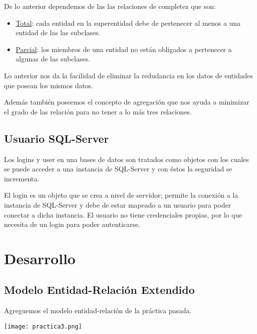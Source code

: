 \documentclass[12pt, letterpaper]{article}
\begin{document}
        De lo anterior dependemos de las las relaciones de completez que son:

        \begin{itemize}
            \item \underline{Total}: cada entidad en la superentidad debe de pertenecer 
                                     al menos a una entidad de las las subclases.
            \item \underline{Parcial}: los miembros de una entidad no están obligados
                                        a pertenecer a algunas de las subclases.
        \end{itemize}

        Lo anterior nos da la facilidad de eliminar la redudancia en los datos de entidades
        que posean los mismos datos.

        Además también poseemos el concepto de agregación que nos ayuda a minimizar el grado
        de las relación para no tener a lo más tres relaciones.

        \subsection*{Usuario SQL-Server}
        Los logins y user en una bases de datos son tratados como objetos con los
        cuales se puede acceder a una instancia de SQL-Server y con éstos la 
        seguridad se incrementa.\vspace{.3cm}
        
        El login es un objeto que se crea a nivel de servidor; permite la conexión
        a la instancia de SQL-Server y debe de estar mapeado a un usuario para poder
        conectar a dicha instancia. El usuario no tiene credenciales propias, por
        lo que necesita de un login para poder autenticarse.


    \section*{Desarrollo}

        \subsection*{Modelo Entidad-Relación Extendido}
        Agreguemos el modelo entidad-relación de la práctica pasada. \vspace{.3cm}

        \texttt{[image: practica3.png]}\vspace{.3cm}
\end{document}
